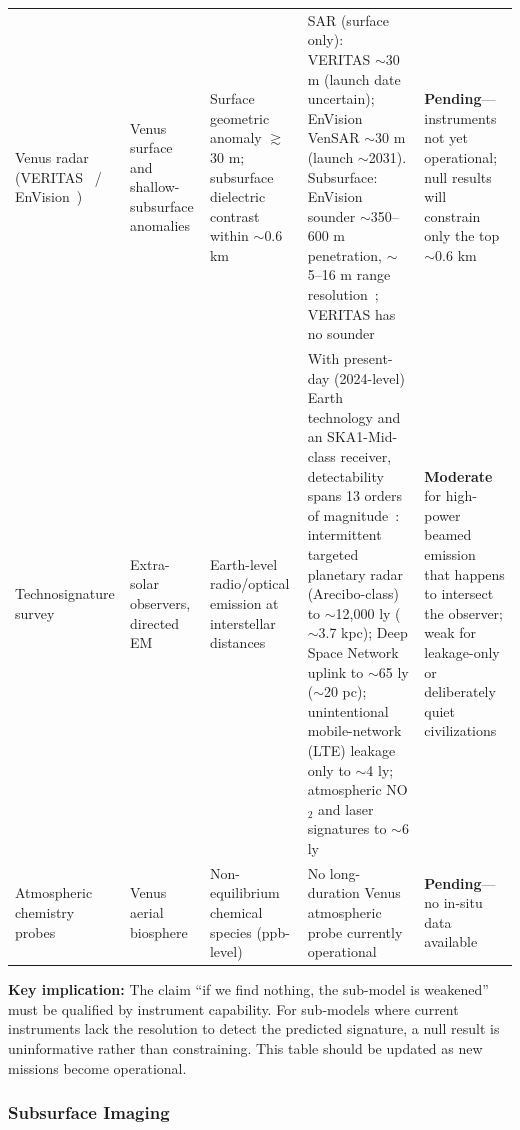 \documentclass[aps,prd,twocolumn,superscriptaddress,nofootinbib]{revtex4-2}
\begin{document}
\begin{table}[htbp]
\begin{tabular}{P{0.118\textwidth}P{0.106\textwidth}P{0.152\textwidth}P{0.269\textwidth}P{0.202\textwidth}}
Venus radar (VERITAS~\cite{NASA_VERITAS} / EnVision~\cite{ESA_EnVision}) & Venus surface and shallow-subsurface anomalies & Surface geometric anomaly $\gtrsim$30 m; subsurface dielectric contrast within ${\sim}$0.6 km & SAR (surface only): VERITAS ${\sim}$30 m (launch date uncertain); EnVision VenSAR ${\sim}$30 m (launch ${\sim}$2031). Subsurface: EnVision sounder ${\sim}$350--600 m penetration, ${\sim}$5--16 m range resolution~\cite{ESA_EnVision_VESPER}; VERITAS has no sounder & \textbf{Pending}---instruments not yet operational; null results will constrain only the top ${\sim}$0.6 km \\
Technosignature survey~\cite{Sheikh2025} & Extra-solar observers, directed EM & Earth-level radio/optical emission at interstellar distances & With present-day (2024-level) Earth technology and an SKA1-Mid-class receiver, detectability spans 13 orders of magnitude~\cite{Sheikh2025}: intermittent targeted planetary radar (Arecibo-class) to ${\sim}$12,000 ly (${\sim}$3.7 kpc); Deep Space Network uplink to ${\sim}$65 ly (${\sim}$20 pc); unintentional mobile-network (LTE) leakage only to ${\sim}$4 ly; atmospheric NO$_{2}$ and laser signatures to ${\sim}$6 ly & \textbf{Moderate} for high-power beamed emission that happens to intersect the observer; weak for leakage-only or deliberately quiet civilizations \\
Atmospheric chemistry probes & Venus aerial biosphere & Non-equilibrium chemical species (ppb-level) & No long-duration Venus atmospheric probe currently operational & \textbf{Pending}---no in-situ data available \\
\bottomrule
\end{tabular}
\end{table}

\textbf{Key implication:} The claim ``if we find nothing, the sub-model is weakened'' must be qualified by instrument capability. For sub-models where current instruments lack the resolution to detect the predicted signature, a null result is uninformative rather than constraining. This table should be updated as new missions become operational.

\subsubsection{Subsurface Imaging}\label{sec:subsurface-imaging}
\end{document}

